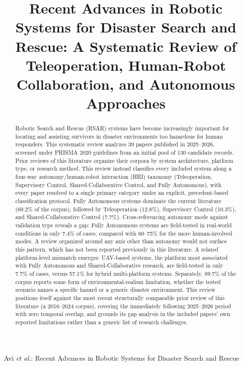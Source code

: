 \documentclass[journal]{IEEEtran}
\begin{document}
\title{Recent Advances in Robotic Systems for Disaster Search and Rescue: A Systematic Review of Teleoperation, Human-Robot Collaboration, and Autonomous Approaches}

\author{
}

%
{Avi \MakeLowercase{\textit{et al.}}: Recent Advances in Robotic Systems for Disaster Search and Rescue}

\maketitle

\begin{abstract}
Robotic Search and Rescue (RSAR) systems have become increasingly important for locating and assisting survivors in disaster environments too hazardous for human responders. This systematic review analyzes 39 papers published in 2025--2026, screened under PRISMA 2020 guidelines from an initial pool of 130 candidate records. Prior reviews of this literature organize their corpora by system architecture, platform type, or research method. This review instead classifies every included system along a four-way autonomy/human-robot interaction (HRI) taxonomy (Teleoperation, Supervisory Control, Shared-Collaborative Control, and Fully Autonomous), with every paper resolved to a single primary category under an explicit, precedent-based classification protocol. Fully Autonomous systems dominate the current literature (69.2\% of the corpus), followed by Teleoperation (12.8\%), Supervisory Control (10.3\%), and Shared-Collaborative Control (7.7\%). Cross-referencing autonomy mode against validation type reveals a gap: Fully Autonomous systems are field-tested in real-world conditions in only 7.4\% of cases, compared with 60--75\% for the more human-involved modes. A review organized around any axis other than autonomy would not surface this pattern, which has not been reported previously in this literature. A related platform-level mismatch emerges: UAV-based systems, the platform most associated with Fully Autonomous and Shared-Collaborative research, are field-tested in only 7.7\% of cases, versus 57.1\% for hybrid multi-platform systems. Separately, 89.7\% of the corpus reports some form of environmental-realism limitation, whether the tested scenario names a specific hazard or a generic disaster environment. This review positions itself against the most recent structurally comparable prior review of this literature (a 2016--2024 corpus), covering the immediately following 2025--2026 period with zero temporal overlap, and grounds its gap analysis in the included papers' own reported limitations rather than a generic list of research challenges.
\end{abstract}
\end{document}
